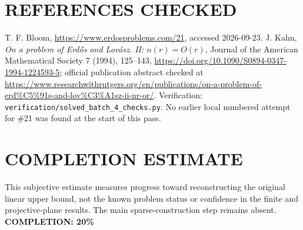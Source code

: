 \section{REFERENCES CHECKED}
T. F. Bloom, \url{https://www.erdosproblems.com/21}, accessed 2026-09-23. J. Kahn, \emph{On a problem of Erd\H{o}s and Lov\'asz. II: $n(r)=O(r)$}, Journal of the American Mathematical Society 7 (1994), 125--143, \url{https://doi.org/10.1090/S0894-0347-1994-1224593-5}; official publication abstract checked at \url{https://www.researchwithrutgers.org/en/publications/on-a-problem-of-erd%C5%91s-and-lov%C3%A1sz-ii-nr-or/}. Verification: \texttt{verification/solved\_batch\_4\_checks.py}. No earlier local numbered attempt for \#21 was found at the start of this pass.

\section{COMPLETION ESTIMATE}
This subjective estimate measures progress toward reconstructing the original linear upper bound, not the known problem status or confidence in the finite and projective-plane results. The main sparse-construction step remains absent.
\textbf{COMPLETION: 20\%}
